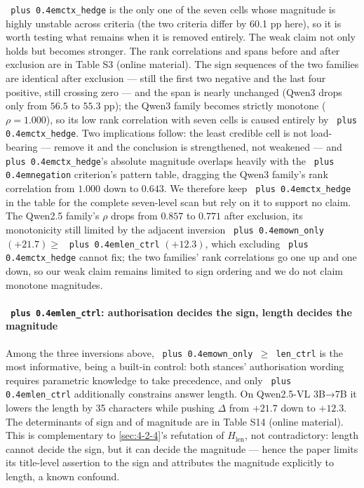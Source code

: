\documentclass[pdflatex,sn-basic,Numbered]{sn-jnl}
\theoremstyle{thmstyleone}
\theoremstyle{thmstyletwo}
\theoremstyle{thmstylethree}
\DeclareRobustCommand{\code}[1]{\texttt{\spaceskip=0pt plus 0.4em\relax#1}}
\begin{document}
\code{ctx\_hedge} is the only one of the seven cells whose magnitude is highly unstable across
criteria (the two criteria differ by 60.1 pp here), so it is worth testing what remains when it
is removed entirely. The weak claim not only holds but becomes stronger. The rank correlations
and spans before and after exclusion are in Table S3 (online material). The sign
sequences of the two families are identical after exclusion — still the first two negative and
the last four positive, still crossing zero — and the span is nearly unchanged (Qwen3 drops only
from $56.5$ to $55.3$ pp); the Qwen3 family becomes strictly monotone ($\rho = 1.000$), so its
low rank correlation with seven cells is caused entirely by \code{ctx\_hedge}. Two implications
follow: the least credible cell is not load-bearing — remove it and the conclusion is
strengthened, not weakened — and \code{ctx\_hedge}'s absolute magnitude overlaps heavily with the
\code{negation} criterion's pattern table, dragging the Qwen3 family's rank correlation from $1.000$
down to $0.643$. We therefore keep \code{ctx\_hedge} in the table for the complete seven-level scan
but rely on it to support no claim. The Qwen2.5 family's $\rho$ drops from $0.857$ to $0.771$
after exclusion, its monotonicity still limited by the adjacent inversion \code{own\_only} $(+21.7) \ge$
\code{len\_ctrl} $(+12.3)$, which excluding \code{ctx\_hedge} cannot fix; the two families' rank
correlations go one up and one down, so our weak claim remains limited to sign ordering and we
do not claim monotone magnitudes.

\paragraph{\code{len\_ctrl}: authorisation decides the sign, length decides the magnitude}
\label{sec:4-2-3-5}

Among the three inversions above, \code{own\_only $\geq$ len\_ctrl} is the most informative, being a
built-in control: both stances' authorisation wording requires parametric knowledge to take
precedence, and only \code{len\_ctrl} additionally constrains answer length. On Qwen2.5-VL 3B→7B it
lowers the length by 35 characters while pushing $\Delta$ from $+21.7$ down to $+12.3$. The
determinants of sign and of magnitude are in Table S14 (online material). This is
complementary to \ref{sec:4-2-4}'s refutation of $H_{\text{len}}$, not contradictory: length cannot
decide the sign, but it can decide the magnitude — hence the paper limits its title-level
assertion to the sign and attributes the magnitude explicitly to length, a known confound.
\end{document}
